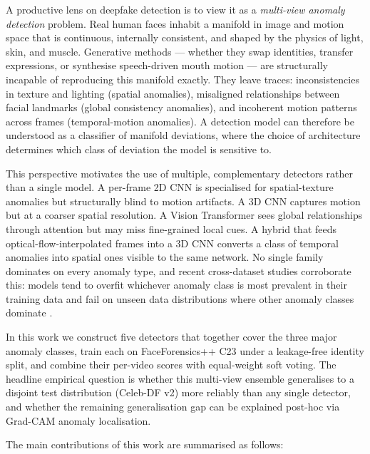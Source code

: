 A productive lens on deepfake detection is to view it as a \textit{multi-view anomaly detection} problem. Real human faces inhabit a manifold in image and motion space that is continuous, internally consistent, and shaped by the physics of light, skin, and muscle. Generative methods — whether they swap identities, transfer expressions, or synthesise speech-driven mouth motion — are structurally incapable of reproducing this manifold exactly. They leave traces: inconsistencies in texture and lighting (spatial anomalies), misaligned relationships between facial landmarks (global consistency anomalies), and incoherent motion patterns across frames (temporal-motion anomalies). A detection model can therefore be understood as a classifier of manifold deviations, where the choice of architecture determines which class of deviation the model is sensitive to.

This perspective motivates the use of multiple, complementary detectors rather than a single model. A per-frame 2D CNN is specialised for spatial-texture anomalies but structurally blind to motion artifacts. A 3D CNN captures motion but at a coarser spatial resolution. A Vision Transformer sees global relationships through attention but may miss fine-grained local cues. A hybrid that feeds optical-flow-interpolated frames into a 3D CNN converts a class of temporal anomalies into spatial ones visible to the same network. No single family dominates on every anomaly type, and recent cross-dataset studies corroborate this: models tend to overfit whichever anomaly class is most prevalent in their training data and fail on unseen data distributions where other anomaly classes dominate \cite{korshunov2022generalization, wang2023crossdf}.

In this work we construct five detectors that together cover the three major anomaly classes, train each on FaceForensics++ C23 under a leakage-free identity split, and combine their per-video scores with equal-weight soft voting. The headline empirical question is whether this multi-view ensemble generalises to a disjoint test distribution (Celeb-DF v2) more reliably than any single detector, and whether the remaining generalisation gap can be explained post-hoc via Grad-CAM anomaly localisation.



The main contributions of this work are summarised as follows:

